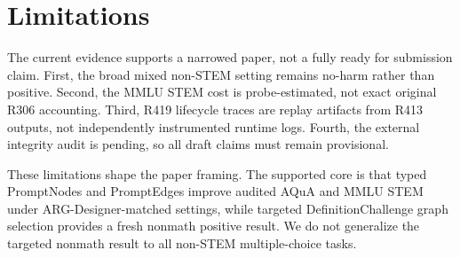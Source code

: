 \section{Limitations}
\label{sec:limitations}

The current evidence supports a narrowed paper, not a fully ready for submission claim. First, the broad mixed non-STEM setting remains no-harm rather than positive. Second, the MMLU STEM cost is probe-estimated, not exact original R306 accounting. Third, R419 lifecycle traces are replay artifacts from R413 outputs, not independently instrumented runtime logs. Fourth, the external integrity audit is pending, so all draft claims must remain provisional.

These limitations shape the paper framing. The supported core is that typed PromptNodes and PromptEdges improve audited AQuA and MMLU STEM under ARG-Designer-matched settings, while targeted DefinitionChallenge graph selection provides a fresh nonmath positive result. We do not generalize the targeted nonmath result to all non-STEM multiple-choice tasks.
